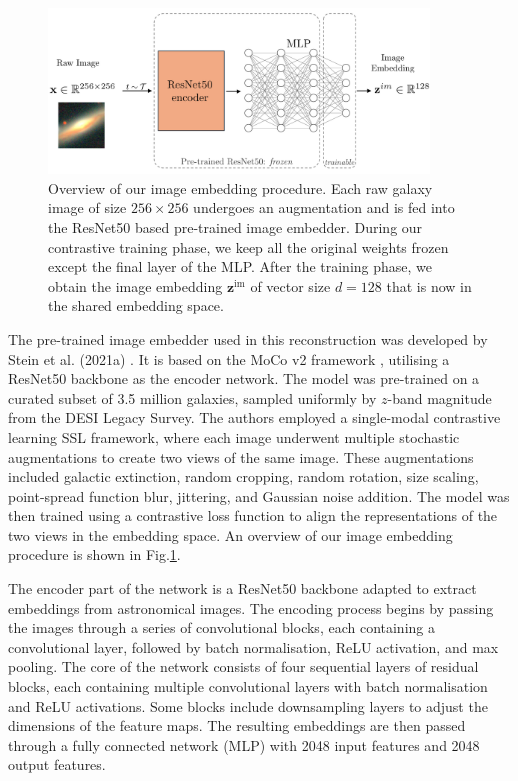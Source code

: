 \documentclass[a4paper,12pt]{article}
\begin{document}
\begin{figure}[H]
    \centering
    \includegraphics[width=0.9\textwidth]{../figures/diagram_resnet.pdf}
    \caption{Overview of our image embedding procedure. Each raw galaxy image of size $256 \times 256$ undergoes an augmentation and is fed into the ResNet50 based pre-trained image embedder. During our contrastive training phase, we keep all the original weights frozen except the final layer of the MLP. After the training phase, we obtain the image embedding $\mathbf{z}^{\text{im}}$ of vector size $d=128$ that is now in the shared embedding space.}
    \label{fig:resnet}
\end{figure}
The pre-trained image embedder used in this reconstruction was developed by Stein et al. (2021a) \cite{stein}. It is based on the MoCo v2 framework \cite{mocov2}, utilising a ResNet50 backbone as the encoder network. The model was pre-trained on a curated subset of 3.5 million galaxies, sampled uniformly by $z$-band magnitude from the DESI Legacy Survey. The authors employed a single-modal contrastive learning SSL framework, where each image underwent multiple stochastic augmentations to create two views of the same image. These augmentations included galactic extinction, random cropping, random rotation, size scaling, point-spread function blur, jittering, and Gaussian noise addition. The model was then trained using a contrastive loss function to align the representations of the two views in the embedding space. An overview of our image embedding procedure is shown in Fig.\ref{fig:resnet}.

The encoder part of the network is a ResNet50 backbone adapted to extract embeddings from astronomical images. The encoding process begins by passing the images through a series of convolutional blocks, each containing a convolutional layer, followed by batch normalisation, ReLU activation, and max pooling. The core of the network consists of four sequential layers of residual blocks, each containing multiple convolutional layers with batch normalisation and ReLU activations. Some blocks include downsampling layers to adjust the dimensions of the feature maps. The resulting embeddings are then passed through a fully connected network (MLP) with 2048 input features and 2048 output features.
\end{document}
